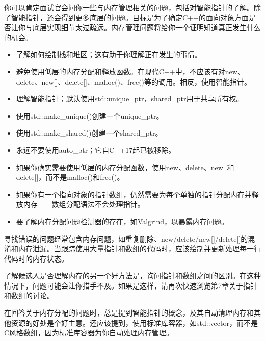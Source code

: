 
你可以肯定面试官会问你一些与内存管理相关的问题，包括对智能指针的了解。除了智能指针，还会得到更多底层的问题。目标是为了确定C++的面向对象方面是否让你与底层实现细节太过疏远。内存管理问题将给你一个证明知道真正发生什么的机会。


\begin{itemize}
\item
了解如何绘制栈和堆区；这有助于你理解正在发生的事情。

\item
避免使用低层的内存分配和释放函数。在现代C++中，不应该有对new、delete、new[]、delete[]、malloc()、free()等的调用。相反，使用智能指针。

\item
理解智能指针；默认使用std::unique\_ptr，shared\_ptr用于共享所有权。

\item
使用std::make\_unique()创建一个unique\_ptr。

\item
使用std::make\_shared()创建一个shared\_ptr。

\item
永远不要使用auto\_ptr；它自C++17起已被移除。

\item
如果你确实需要使用低层的内存分配函数，使用new、delete、new[]和delete[]，而不是malloc()和free()。

\item
如果你有一个指向对象的指针数组，仍然需要为每个单独的指针分配内存并释放内存——数组分配语法不会处理指针。

\item
要了解内存分配问题检测器的存在，如Valgrind，以暴露内存问题。
\end{itemize}


寻找错误的问题经常包含内存问题，如重复删除、new/delete/new[]/delete[]的混淆和内存泄漏。当跟踪使用大量指针和数组的代码时，应该绘制并更新处理每一行代码时的内存状态。

了解候选人是否理解内存的另一个好方法是，询问指针和数组之间的区别。在这种情况下，问题可能会让你措手不及。如果是这样，请再次快速浏览第7章关于指针和数组的讨论。

在回答关于内存分配的问题时，总是提到智能指针的概念，及其自动清理内存和其他资源的好处是个好主意。还应该提到，使用标准库容器，如std::vector，而不是C风格数组，因为标准库容器为你自动处理内存管理。








